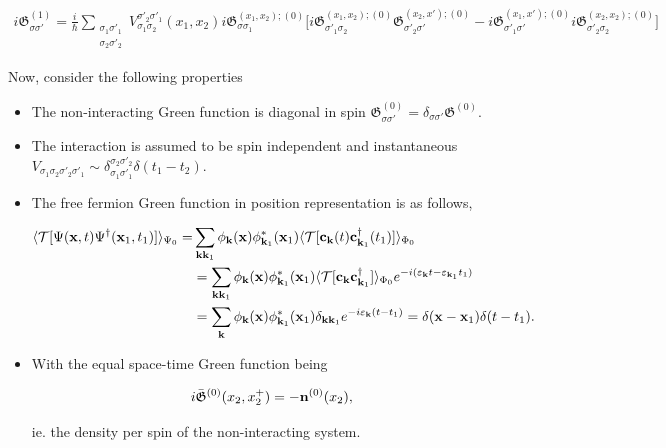 \begin{equation}
    \begin{split}
        i \mathfrak{G}^{(1)}_{\sigma \sigma'} = \frac{i}{\hbar} \sum_{\substack{\sigma_1 \sigma'_1 \\
        \sigma_2 \sigma'_2}} V_{\sigma_1\sigma_2}^{\sigma'_2\sigma'_1}(x_1,x_2) i \mathfrak{G}^{(x_1, x_2); (0)}_{\sigma\sigma_1} \bigg[ i \mathfrak{G}^{(x_1,x_2); (0)}_{\sigma'_1\sigma_2}
        \mathfrak{G}^{(x_2, x'); (0)}_{\sigma'_2\sigma'} 
         -
        i \mathfrak{G}^{(x_1,x'); (0)}_{\sigma'_1\sigma'} 
        i \mathfrak{G}^{(x_2, x_2); (0)}_{\sigma'_2\sigma_2} \bigg]
    \end{split}
\end{equation}

Now, consider the following properties 

\begin{itemize}
    \item The non-interacting Green function is diagonal in spin $\mathfrak{G}_{\sigma \sigma'}^{(0)} = \delta_{\sigma \sigma'} \mathfrak{G}^{(0)}$.
    \item The interaction is assumed to be spin independent and instantaneous $V_{\sigma_1 \sigma_2 \sigma'_2 \sigma'_1} \sim \delta_{\sigma_1 \sigma'_1}^{\sigma_2 \sigma'_2} \delta(t_1-t_2)$.
    \item The free fermion Green function in position representation is as follows, 
    
\begin{equation}
    \begin{split}
        \langle \mathcal{T} [\Psi({\bf x},t) \Psi^\dagger({\bf x}_1, t_1)] \rangle_{\Psi_0} =& \sum_{{\bf k} {\bf k}_1} \phi_{{\bf k}}({\bf x})\phi^{*}_{{\bf k}_1}({\bf x}_1) \langle \mathcal{T} [{\bf c}_{{\bf k}}(t) {\bf c}_{{\bf k}_1}^\dagger(t_1)] \rangle_{\Phi_0} \\
        &= \sum_{{\bf k} {\bf k}_1} \phi_{{\bf k}}({\bf x})\phi^{*}_{{\bf k}_1}({\bf x}_1) \langle \mathcal{T} [{\bf c}_{{\bf k}} {\bf c}_{{\bf k}_1}^\dagger] \rangle_{\Phi_0} e^{-i(\varepsilon_{{\bf k}}t - {\varepsilon}_{{\bf k}_1} t_1)} \\
        &= \sum_{{\bf k}} \phi_{{\bf k}}({\bf x})\phi^{*}_{{\bf k}_1}({\bf x}_1) \delta_{{\bf k} {\bf k}_1} e^{-i\varepsilon_{{\bf k}}(t-t_1)} = \delta({\bf x} - {\bf x}_1) \delta(t-t_1). 
    \end{split}
\end{equation}

\item With the equal space-time Green function being 

\begin{equation}
    i \bar{\mathfrak{G}}^{(0)}(x_2, x_2^+) = - {\bf n}^{(0)}(x_2),
\end{equation}

        ie. the density per spin of the non-interacting system. 
\end{itemize}

